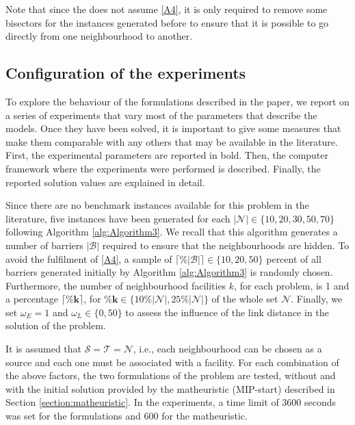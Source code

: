 \documentclass[a4paper,  review, authoryear, 1p.]{elsarticle}
\newcommand{\KMPN}{{\sf{H-KMPN}\xspace }}
\begin{document}
		
		Note that since the \KMPN \xspace does not assume \ref{A4}, it is only required to remove some bisectors for the instances generated before to ensure that it is possible to go directly from one neighbourhood to another.
		

		\subsection{Configuration of the experiments}
		To explore the behaviour of the formulations described in the paper, we report on a series of experiments that vary most of the parameters that describe the models. Once they have been solved, it is important to give some measures that make them comparable with any others that may be available in the literature. First, the experimental parameters are reported in bold. Then, the computer framework where the experiments were performed is described. Finally, the reported solution values are explained in detail. 
		
		Since there are no benchmark instances available for this problem in the literature, five instances have been generated for each $\bm{|\mathcal N|}\in\{10, 20, 30, 50, 70\}$ following Algorithm \ref{alg:Algorithm3}. We recall that this algorithm generates a number of barriers $|\mathcal B|$ required to ensure that the neighbourhoods are hidden. To avoid the fulfilment of \ref{A4}, a sample of $\bm{\lceil \% |\mathcal B| \rceil } \in\{10, 20, 50\}$ percent of all barriers generated initially by Algorithm \ref{alg:Algorithm3} is randomly chosen.  Furthermore, the number of neighbourhood facilities $k$, for each problem, is 1 and a percentage $\bm{\lceil \% k \rceil}$, for $\bm{\% k}\in\{10 \% |\mathcal N|, 25\% |\mathcal N|\}$ of the whole set $\mathcal N$.  Finally, we set $\omega_E=1$ and $\omega_L\in\{0,50\}$ to assess the influence of the link distance in the solution of the problem.
		
		It is assumed that $\mathcal S=\mathcal T=\mathcal N$, i.e., each neighbourhood can be chosen as a source and each one must be associated with a facility.
		For each combination of the above factors, the two formulations of the problem are tested, without and with the initial solution provided by the matheuristic (MIP-start) described in Section \ref{section:matheuristic}. In the experiments, a time limit of 3600 seconds was set for the formulations and 600 for the matheuristic.
		
\end{document}

